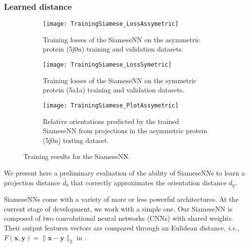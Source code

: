 \subsubsection{Learned distance}\label{sec:results:distance-estimation:learned}


\begin{figure}
    \centering
    \begin{subfigure}[t]{0.4\textwidth}
        \texttt{[image: TrainingSiamese\_LossAssymetric]}
        \caption{Training losses of the SiameseNN on the asymmetric protein (5j0n) training and validation datasets.}
        \label{fig:losses-siamese-assym}
    \end{subfigure} \quad \quad
    \begin{subfigure}[t]{0.4\textwidth}
        \texttt{[image: TrainingSiamese\_LossSymetric]}
        \caption{Training losses of the SiameseNN on the symmetric protein (5a1a) training and validation datasets.}
        \label{fig:losses-siamese-sym}
    \end{subfigure} \vspace{0.45cm}
    \begin{subfigure}[t]{0.4\textwidth}
        \texttt{[image: TrainingSiamese\_PlotAssymetric]}
        \caption{Relative orientations predicted by the trained SiameseNN from projections in the asymmetric protein (5j0n) testing dataset.
}
        \label{fig:learned-distance-siamese}
    \end{subfigure} \vspace{0.35cm}
    \caption{Training results for the SiameseNN.}
    \label{fig:losses-siamese}
\end{figure}

We present here a preliminary evaluation of the ability of SiameseNNs to learn a projection distance $\widehat{d}_b$ that correctly approximates the orientation distance $d_q$.

SiameseNNs come with a variety of more or less powerful architectures.
At the current stage of development, we work with a simple one.
Our SiameseNN is composed of two convolutional neural networks (CNNs) with shared weights.
Their output features vectors are compared through an Eulidean distance, \textit{i.e.}, $F(\mathbf{x},\mathbf{y})=\lVert \mathbf{x}-\mathbf{y}\rVert_2$ in .

